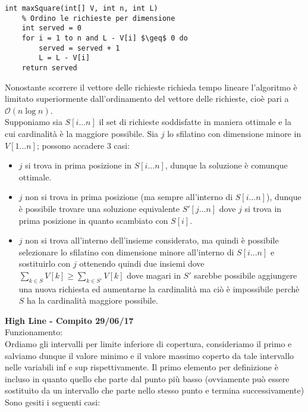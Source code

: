 \documentclass[../cheatSheetAlgoritmi.tex]{subfiles}
\begin{document}
\begin{lstlisting}[caption=Sfilatino alla Nutella]
int maxSquare(int[] V, int n, int L)
	% Ordino le richieste per dimensione
	int served = 0
	for i = 1 to n and L - V[i] $\geq$ 0 do
		served = served + 1
		L = L - V[i]
	return served
\end{lstlisting}
Nonostante scorrere il vettore delle richieste richieda tempo lineare l'algoritmo è limitato superiormente dall'ordinamento del vettore delle richieste, cioè pari a $\mathcal{O}(n \log{n})$.\\
Supponiamo sia $S[i...n]$ il set di richieste soddisfatte in maniera ottimale e la cui cardinalità è la maggiore possibile. Sia $j$ lo sfilatino con dimensione minore in $V[1...n]$; possono accadere 3 casi:
\begin{itemize}
	\item $j$ si trova in prima posizione in $S[i...n]$, dunque la soluzione è comunque ottimale.
	\item $j$ non si trova in prima posizione (ma sempre all'interno di $S[i...n]$), dunque è possibile trovare una soluzione equivalente $S'[j...n]$ dove $j$ si trova in prima posizione in quanto scambiato con $S[i]$.
	\item $j$ non si trova all'interno dell'insieme considerato, ma quindi è possibile selezionare lo sfilatino con dimensione minore all'interno di $S[i...n]$ e sostituirlo con $j$ ottenendo quindi due insiemi dove $\sum_{k \in S} V[k] \geq \sum_{k \in S'} V[k]$ dove magari in $S'$ sarebbe possibile aggiungere una nuova richiesta ed aumentarne la cardinalità ma ciò è impossibile perchè $S$ ha la cardinalità maggiore possibile.
\end{itemize}
\textbf{High Line - Compito 29/06/17}\\
Funzionamento: \\
Ordiamo gli intervalli per limite inferiore di copertura, consideriamo il primo e salviamo dunque il valore minimo e il valore massimo coperto da tale intervallo nelle variabili inf e sup rispettivamente. Il primo elemento per definizione è incluso in quanto quello che parte dal punto più basso (ovviamente può essere sostituito da un intervallo che parte nello stesso punto e termina successivamente)\\
Sono gesiti i seguenti casi: 
\end{document}
